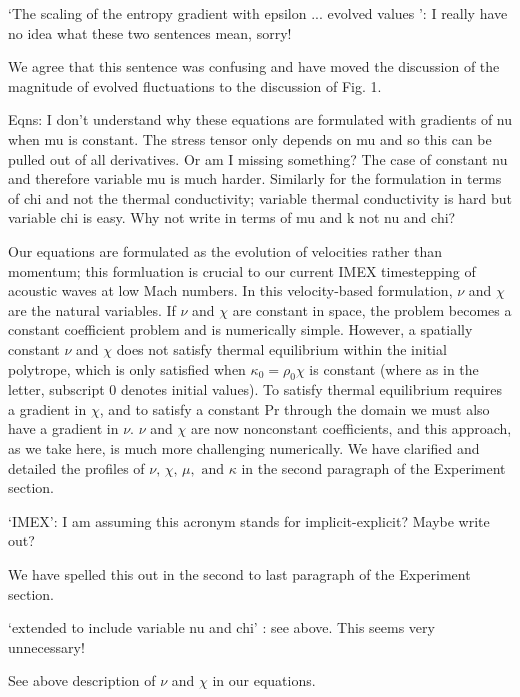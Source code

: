 \documentclass[aps, 11pt, singlecolumn]{revtex4-1} %
\begin{document}
\begin{singlespace}
\begin{myquotation}
`The scaling of the entropy gradient with epsilon ... evolved
values ': I really have no idea what these two sentences mean,
sorry!
\end{myquotation}
We agree that this sentence was confusing and have moved the
discussion of the magnitude of evolved fluctuations to the
discussion of Fig. 1.

\begin{myquotation}
Eqns: I don't understand why these equations are formulated with
gradients of nu when mu is constant. The stress tensor only depends on
mu and so this can be pulled out of all derivatives. Or am I missing
something? The case of constant nu and therefore variable mu is much
harder. Similarly for the formulation in terms of chi and not the
thermal conductivity; variable thermal conductivity is hard but
variable chi is easy. Why not write in terms of mu and k not nu and
chi?
\end{myquotation}
Our equations are formulated as the evolution of velocities rather
than momentum; this formluation is crucial to our current IMEX
timestepping of acoustic waves at low Mach numbers.  
In this velocity-based formulation, $\nu$ and $\chi$ are the
natural variables.  If $\nu$ and $\chi$ are constant in space,
the problem becomes a constant coefficient problem and is numerically
simple.  However, a spatially constant $\nu$ and $\chi$ does not satisfy
thermal equilibrium within the initial polytrope, which is only satisfied when
$\kappa_0 = \rho_0\chi$ is constant (where as in the letter, subscript 0
denotes initial values).  To satisfy thermal equilibrium requires
a gradient in $\chi$, and to satisfy a constant Pr through the domain we
must also have a gradient in $\nu$.  $\nu$ and $\chi$ are now nonconstant
coefficients, and this approach, as we take here, is much more challenging numerically. 
 We have
clarified and detailed the profiles of $\nu, \,\chi, \,\mu,\text{ and }\kappa$
in the second paragraph of the Experiment section.

\begin{myquotation}
`IMEX': I am assuming this acronym stands for implicit-explicit?
Maybe write out?
\end{myquotation}
We have spelled this out in the second to last paragraph of the Experiment section.

\begin{myquotation}
`extended to include variable nu and chi' : see above. This seems
very unnecessary!
\end{myquotation}
See above description of $\nu$ and $\chi$ in our equations.


\end{singlespace}
\end{document}
